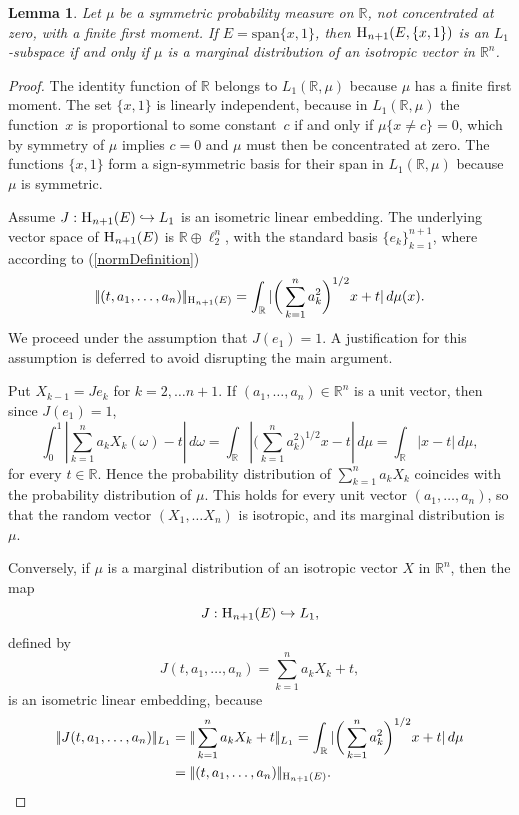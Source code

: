 \documentclass{article}[1100]
\newtheorem{lemma}[theorem]{Lemma}
\theoremstyle{definition}
\theoremstyle{remark}
\newcommand\Ren[1]{\mathbb{R}^{#1}}
\newcommand\ar{\mathbb{R}}
\newcommand\norma[1]{|\!|#1|\!|}
\newcommand\mySpace[2]{\textsc{H}_{#1}(#2)}
\begin{document}
\begin{tcolorbox}
\begin{lemma}\label{myTheorem} Let $\mu$ be  a symmetric probability measure on $\ar$, not concentrated at zero,
 with a finite first moment. If $E=\text{span}\{x,1\}$, then  $\mySpace{n+1}{E,\{x,1\}}$  is an $L_1$-subspace if and only
 if $\mu$ is a marginal distribution of an isotropic vector in $\Ren{n}$.
\end{lemma}
\end{tcolorbox}
\begin{proof} 
The identity function of $\ar$ belongs to $L_1(\ar,\mu)$ because $\mu$ has a finite first moment. The set $\{x,1\}$ is linearly independent, because in $L_1(\ar,\mu)$ the function~$x$ is proportional to some constant~$c$ if and only if 
$\mu\{x\neq c\}=0$, which by symmetry of $\mu$ implies $c=0$ and $\mu$ must then be concentrated at zero.
The functions $\{x,1\}$ form a sign-symmetric basis for their span in $L_1(\ar,\mu)$ because $\mu$ is symmetric.

 Assume  $J:\mySpace{n+1}{E}\hookrightarrow L_1$ is an isometric linear embedding.  The underlying vector space of
  $\mySpace{n+1}{E}$ is $\ar\oplus\ell_2^n$, with the standard basis $\{e_k\}_{k=1}^{n+1}$, where according to (\ref{normDefinition}) 
 \[ \norma{(t,a_1,\dots, a_n)}_{\mySpace{n+1}{E}}=\int_{\ar}|\bigg(\sum_{k=1}^na_k^2\bigg)^{1/2}x+t|\,d\mu(x).\]
 We proceed under the assumption that $J(e_1)= 1$. A justification for this assumption is deferred to avoid disrupting the main argument.
 
\medskip

Put $X_{k-1}=Je_k$ for $k=2,\dots n+1$.  If $(a_1,\dots,a_n) \in\Ren{n}$ is a unit vector, then since $J(e_1)=1$, 
\[ \int_0^1|\sum_{k=1}^na_kX_k(\omega)-t|\,d\omega=\int_{\ar}|\bigg(\sum_{k=1}^na_k^2\bigg)^{1/2}x-t|\,d\mu=\int_{\ar}|x-t|\,d\mu, \]
 for every $t\in\ar$.
Hence the probability distribution of $\sum_{k=1}^na_kX_k$ coincides with the probability distribution of $\mu$. This holds for every unit vector $(a_1,\dots,a_n)$, so that
the random vector $(X_1,\dots X_n)$ is isotropic, and its marginal distribution is $\mu$.

\medskip

Conversely, if $\mu$ is a marginal distribution of an isotropic vector $X$ in $\Ren{n}$, then  the map 
\[ J:\mySpace{n+1}{E}\hookrightarrow L_1,\]
defined by
\[ J(t,a_1,\dots, a_n)=\sum_{k=1}^na_kX_k+t , \]
is an isometric linear embedding, because
\[
\begin{aligned}
\norma{J(t,a_1,\dots,a_n)}_{L_1}&=\norma{\sum_{k=1}^na_kX_k+t}_{L_1}=\int_{\ar}|\bigg(\sum_{k=1}^na_k^2\bigg)^{1/2}x+t|\,d\mu\\
&=\norma{(t,a_1,\dots,a_n)}_{\mySpace{n+1}{E}}.\\
\end{aligned}
\] 


\end{proof}
\end{document}
